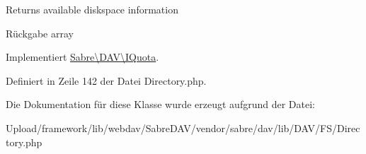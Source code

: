 Returns available diskspace information

\begin{DoxyReturn}{Rückgabe}
array 
\end{DoxyReturn}


Implementiert \mbox{\hyperlink{interface_sabre_1_1_d_a_v_1_1_i_quota_a38730776dffcebd1c486acaf1bf470e4}{Sabre\textbackslash{}\+D\+A\+V\textbackslash{}\+I\+Quota}}.



Definiert in Zeile 142 der Datei Directory.\+php.



Die Dokumentation für diese Klasse wurde erzeugt aufgrund der Datei\+:\begin{DoxyCompactItemize}
\item 
Upload/framework/lib/webdav/\+Sabre\+D\+A\+V/vendor/sabre/dav/lib/\+D\+A\+V/\+F\+S/Directory.\+php\end{DoxyCompactItemize}

